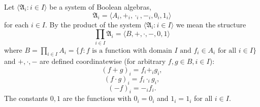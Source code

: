 Let $\langle \mathfrak{A}_i : i \in I \rangle$ be a system of Boolean algebras,
$$\mathfrak{A}_i = \langle A_i, +_i, \cdot_i, -_i, 0_i, 1_i \rangle$$
for each $i \in I$. By the product of the system $\langle \mathfrak{A}_i : i \in I \rangle$ we mean the structure
$$\prod_{i \in I} \mathfrak{A}_i = \langle B, +, \cdot, -, 0, 1 \rangle$$
where $B = \prod_{i \in I} A_i = \{f : f \text{ is a function with domain } I \text{ and } f_i \in A_i \text{ for all } i \in I\}$ and $+, \cdot, -$ are defined coordinatewise (for arbitrary $f, g \in B, i \in I$):
$$(f + g)_i = f_i +_i g_i,$$
$$(f \cdot g)_i = f_i \cdot_i g_i,$$
$$(-f)_i = -_i f_i.$$
The constants $0, 1$ are the functions with $0_i = 0_i$ and $1_i = 1_i$ for all $i \in I$.
